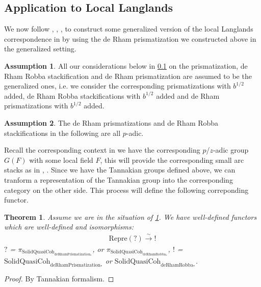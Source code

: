 \documentclass[12pt]{article}
\newtheorem{theorem}{Theorem}
\theoremstyle{definition}
\newtheorem{assumption}{Assumption}
\begin{document}
\subsection{Application to Local Langlands} \label{subsection7.3}

\noindent We now follow \cite{1S5}, \cite{1S6}, \cite{L1}, \cite{1FS} to construct some generalized version of the local Langlands correspondence in \cite{1FS} by using the de Rham prismatization we constructed above in the generalized setting. 


\begin{assumption} \label{assumption3}
All our considerations below in \cref{subsection7.3} on the prismatization, de Rham Robba stackification and de Rham prismatization are assumed to be the generalized ones, i.e. we consider the corresponding prismatizations with $b^{1/2}$ added, de Rham Robba stackifications with $b^{1/2}$ added and de Rham prismatizations with $b^{1/2}$ added. 
\end{assumption}

\begin{assumption}
The de Rham prismatizations and de Rham Robba stackifications in the following are all $p$-adic.
\end{assumption}


\noindent Recall the corresponding context in \cite{1FS} we have the corresponding $p$/$z$-adic group $G(F)$ with some local field $F$, this will provide the corresponding small arc stacks as in \cite{1S5}, \cite{1S6}. Since we have the Tannakian groups defined above, we can tranform a representation of the Tannakian group into the corresponding category on the other side. This process will define the following correponding functor.


\begin{theorem}
Assume we are in the situation of \cref{assumption3}. We have well-defined functors which are well-defined and isomorphisms:
\begin{align}
\mathrm{Repre}(?) \overset{\sim}{\rightarrow}  ! 
\end{align}
$?$ = $\pi_{\mathrm{SolidQuasiCoh}_{\mathrm{deRhamPrismatization}_*}}$, or $\pi_{\mathrm{SolidQuasiCoh}_{\mathrm{deRhamRobba}_*}}$, $!$ = $\mathrm{SolidQuasiCoh}_{\mathrm{deRhamPrismatization}_*}$ or $\mathrm{SolidQuasiCoh}_{\mathrm{deRhamRobba}_*}$.
\end{theorem}


\begin{proof}
By Tannakian formalism.
\end{proof}
\end{document}
